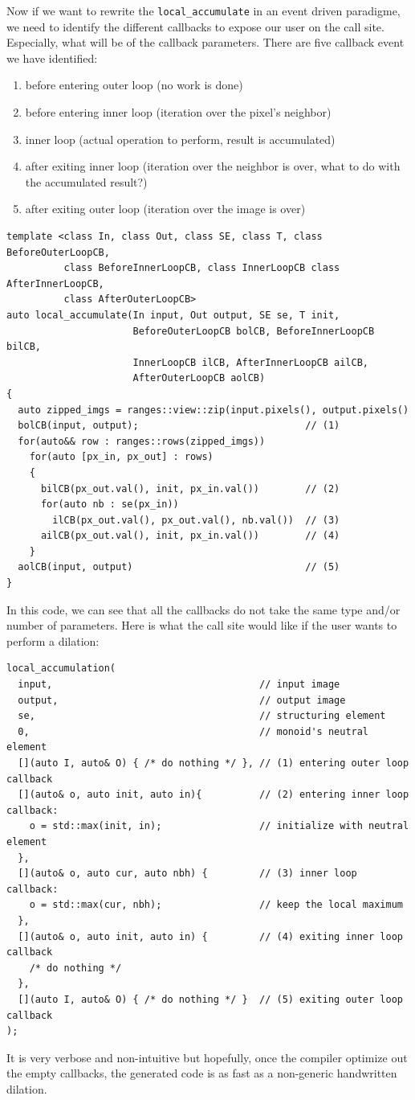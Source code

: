 Now if we want to rewrite the \texttt{local\_accumulate} in an event driven paradigme, we need to identify the different
callbacks to expose our user on the call site. Especially, what will be of the callback parameters. There are five
callback event we have identified:
\begin{enumerate}
  \item before entering outer loop (no work is done)
  \item before entering inner loop (iteration over the pixel's neighbor)
  \item inner loop (actual operation to perform, result is accumulated)
  \item after exiting inner loop (iteration over the neighbor is over, what to do with the accumulated result?)
  \item after exiting outer loop (iteration over the image is over)
\end{enumerate}
\begin{verbatim}
template <class In, class Out, class SE, class T, class BeforeOuterLoopCB, 
          class BeforeInnerLoopCB, class InnerLoopCB class AfterInnerLoopCB,
          class AfterOuterLoopCB>
auto local_accumulate(In input, Out output, SE se, T init, 
                      BeforeOuterLoopCB bolCB, BeforeInnerLoopCB bilCB,
                      InnerLoopCB ilCB, AfterInnerLoopCB ailCB,
                      AfterOuterLoopCB aolCB)
{
  auto zipped_imgs = ranges::view::zip(input.pixels(), output.pixels()
  bolCB(input, output);                             // (1)
  for(auto&& row : ranges::rows(zipped_imgs))
    for(auto [px_in, px_out] : rows)
    {
      bilCB(px_out.val(), init, px_in.val())        // (2)
      for(auto nb : se(px_in))
        ilCB(px_out.val(), px_out.val(), nb.val())  // (3)
      ailCB(px_out.val(), init, px_in.val())        // (4)
    }
  aolCB(input, output)                              // (5)
}
\end{verbatim}
In this code, we can see that all the callbacks do not take the same type and/or number of parameters. Here is what the
call site would like if the user wants to perform a dilation:
\begin{verbatim}
local_accumulation(
  input,                                    // input image
  output,                                   // output image
  se,                                       // structuring element
  0,                                        // monoid's neutral element
  [](auto I, auto& O) { /* do nothing */ }, // (1) entering outer loop callback
  [](auto& o, auto init, auto in){          // (2) entering inner loop callback:
    o = std::max(init, in);                 // initialize with neutral element
  },
  [](auto& o, auto cur, auto nbh) {         // (3) inner loop callback:
    o = std::max(cur, nbh);                 // keep the local maximum
  },
  [](auto& o, auto init, auto in) {         // (4) exiting inner loop callback
    /* do nothing */
  },
  [](auto I, auto& O) { /* do nothing */ }  // (5) exiting outer loop callback
);
\end{verbatim}
It is very verbose and non-intuitive but hopefully, once the compiler optimize out the empty callbacks, the generated
code is as fast as a non-generic handwritten dilation.

